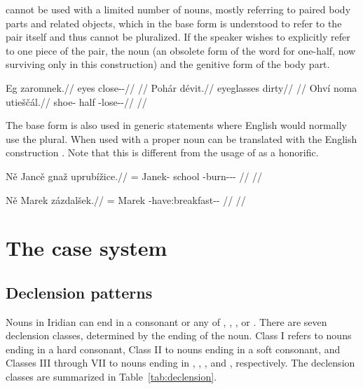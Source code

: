  cannot be used with a limited number of nouns, mostly referring to
paired body parts and related objects, which in the base form is understood to
refer to the pair itself and thus cannot be pluralized. If the speaker wishes to
explicitly refer to one piece of the pair, the noun  (an obsolete form
of the word for one-half, now surviving only in this construction) and the
genitive form of the body part.

\pex
\begingl
\gla Eg zaromnek.//
\glb eyes close-\Pv{}-\Pf{}//
\glft {}//
\endgl
\xe
\pex
\begingl
\gla Pohár dévit.//
\glb eyeglasses dirty//
\glft {}//
\endgl
\xe
\pex
\begingl
\gla Ohví noma utieščál.//
\glb shoe-\Gen{} half \Refl{}-lose-\Av{}-\Cont{}//
\glft {}//
\endgl
\xe

The base form is also used in generic statements where English would normally
use the plural. When used with a
proper noun  can be translated with the English construction . Note that this is different from the usage of  as a honorific.

\pex
\begingl
    \gla Ně Jancě gnaž uprubížice.//
    \glb \Pl{}= Janek-\Gen{} school \Refl{}-burn-\Av{}-\Pf{}-\Quot{} //
    \glft {}//
\endgl
\xe

\pex
\begingl
    \gla Ně Marek zázdalšek.//
    \glb \Pl{}= Marek \Neg{}-have:breakfast-\Av{}-\Pf{} //
    \glft {}//
\endgl
\xe

\section{The case system}

\subsection{Declension patterns}

Nouns in Iridian can end in a consonant or any of , , ,
 or . There are seven declension classes, determined by the
ending of the noun. Class I refers to nouns ending in a hard consonant, Class II
to nouns ending in a soft consonant, and Classes III through VII to nouns ending
in , , ,  and , respectively. The
declension classes are summarized in Table~\ref{tab:declension}.


